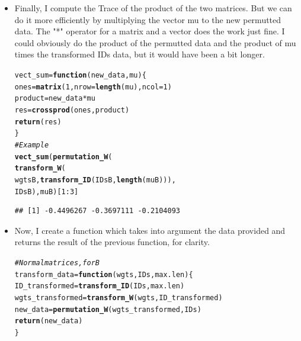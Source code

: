 \documentclass{llncs}\usepackage[]{graphicx}\usepackage[]{color}
\makeatletter
\newcommand{\hlnum}[1]{\textcolor[rgb]{0.686,0.059,0.569}{#1}}%
\newcommand{\hlcom}[1]{\textcolor[rgb]{0.678,0.584,0.686}{\textit{#1}}}%
\newcommand{\hlopt}[1]{\textcolor[rgb]{0,0,0}{#1}}%
\newcommand{\hlstd}[1]{\textcolor[rgb]{0.345,0.345,0.345}{#1}}%
\newcommand{\hlkwa}[1]{\textcolor[rgb]{0.161,0.373,0.58}{\textbf{#1}}}%
\newcommand{\hlkwb}[1]{\textcolor[rgb]{0.69,0.353,0.396}{#1}}%
\newcommand{\hlkwc}[1]{\textcolor[rgb]{0.333,0.667,0.333}{#1}}%
\newcommand{\hlkwd}[1]{\textcolor[rgb]{0.737,0.353,0.396}{\textbf{#1}}}%
\newenvironment{kframe}{%
 \def\at@end@of@kframe{}%
 \ifinner\ifhmode%
  \def\at@end@of@kframe{\end{minipage}}%
  \begin{minipage}{\columnwidth}%
 \fi\fi%
 \def\FrameCommand##1{\hskip\@totalleftmargin \hskip-\fboxsep
 \colorbox{shadecolor}{##1}\hskip-\fboxsep
     \hskip-\linewidth \hskip-\@totalleftmargin \hskip\columnwidth}%
 \MakeFramed {\advance\hsize-\width
   \@totalleftmargin\z@ \linewidth\hsize
   \@setminipage}}%
 {\par\unskip\endMakeFramed%
 \at@end@of@kframe}
\newenvironment{knitrout}{}{} %
\makeatother
\begin{document}
\begin {itemize}
\item Finally, I compute the Trace of the product of the two matrices. But we can do it more efficiently by multiplying the vector mu to the new permutted data. The "*" operator for a matrix and a vector does the work just fine. I could obviously do the product of the permutted data and the product of mu times the transformed IDs data, but it would have been a bit longer.
\begin{knitrout}
\color{fgcolor}\begin{kframe}
\begin{alltt}
\hlstd{vect_sum} \hlkwb{=} \hlkwa{function}\hlstd{(}\hlkwc{new_data}\hlstd{,} \hlkwc{mu}\hlstd{)\{}
  \hlstd{ones}\hlkwb{=} \hlkwd{matrix}\hlstd{(}\hlnum{1}\hlstd{,}\hlkwc{nrow}\hlstd{=}\hlkwd{length}\hlstd{(mu),}\hlkwc{ncol}\hlstd{=}\hlnum{1}\hlstd{)}
  \hlstd{product}\hlkwb{=}\hlstd{new_data}\hlopt{*}\hlstd{mu}
  \hlstd{res}\hlkwb{=}\hlkwd{crossprod}\hlstd{(ones,product)}
  \hlkwd{return}\hlstd{(res)}
\hlstd{\}}
\hlcom{# Example}
\hlkwd{vect_sum}\hlstd{(}\hlkwd{permutation_W}\hlstd{(}
  \hlkwd{transform_W}\hlstd{(}
    \hlstd{wgtsB,}\hlkwd{transform_ID}\hlstd{(IDsB,}\hlkwd{length}\hlstd{(muB))),}
  \hlstd{IDsB),muB)[}\hlnum{1}\hlopt{:}\hlnum{3}\hlstd{]}
\end{alltt}
\begin{lstlisting}[basicstyle=\ttfamily,breaklines=true]
## [1] -0.4496267 -0.3697111 -0.2104093
\end{lstlisting}
\end{kframe}
\end{knitrout}
\item Now, I create a function which takes into argument the data provided and returns the result of the previous function, for clarity.
\begin{knitrout}
\color{fgcolor}\begin{kframe}
\begin{alltt}
\hlcom{# Normal matrices, for B}
\hlstd{transform_data} \hlkwb{=} \hlkwa{function}\hlstd{(}\hlkwc{wgts}\hlstd{,}\hlkwc{IDs}\hlstd{,}\hlkwc{max.len}\hlstd{)\{}
  \hlstd{ID_transformed}\hlkwb{=}\hlkwd{transform_ID}\hlstd{(IDs,max.len)}
  \hlstd{wgts_transformed}\hlkwb{=}\hlkwd{transform_W}\hlstd{(wgts,ID_transformed)}
  \hlstd{new_data}\hlkwb{=}\hlkwd{permutation_W}\hlstd{(wgts_transformed,IDs)}
  \hlkwd{return}\hlstd{(new_data)}
\hlstd{\}}
\end{alltt}
\end{kframe}
\end{knitrout}

\end {itemize}
\end{document}
